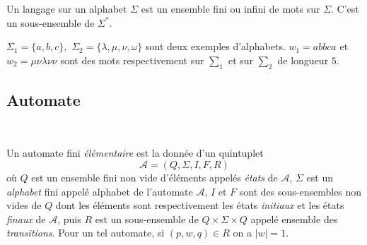  Un langage sur un alphabet $\Sigma$ est un  ensemble fini ou infini de mots sur $\Sigma$. C'est un sous-ensemble de $\Sigma^{*}$.
\begin{Ex}\label{exaut1}
 $\Sigma_{1} = \{a,b,c\},$  $\Sigma_{2}= \{\lambda,\mu,\nu,\omega\}$ sont deux exemples d'alphabets. $w_{1}=abbca$ et $w_{2}=\mu\nu\lambda\nu\nu$ sont des mots respectivement sur $\sum_{1}$  et sur $\sum_{2}$ de longueur $5$.
\end{Ex}
\begin{spacing}{0.30}
\subsection{Automate}\label{defaut2}\mbox{ }\\
\end{spacing}
Un automate fini \emph{élémentaire}  est la donnée d'un  quintuplet
$$\mathcal{A}= \left(Q,\Sigma,I,F,R\right)$$
où $Q$ est un ensemble fini non vide d'éléments appelés  \emph{états} de $\mathcal{A}$, $\Sigma$ est un \emph{alphabet} fini appelé alphabet de l'automate $\mathcal{A}$, $I$ et $F$ sont des sous-ensembles non vides de $Q$  dont les éléments sont respectivement les états \emph{initiaux} et les états \emph{finaux} de $\mathcal{A}$, puis $R$ est un sous-ensemble de $Q \times \Sigma \times Q$ appelé ensemble des \emph{transitions}. 
Pour un  tel automate, si $(p,w,q)\in R$ on a $\vert w \vert =1$. 

